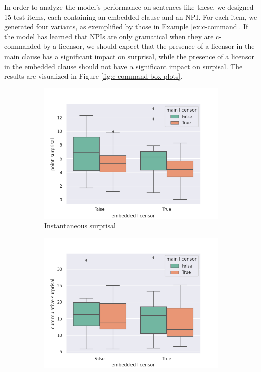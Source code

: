 \documentclass[11pt, round]{article}
\begin{document}
In order to analyze the model's performance on sentences like these, we designed 15 test items, each containing an embedded clause and an NPI. For each item, we generated four variants, as exemplified by those in Example \ref{ex:c-command}. If the model has learned that NPIs are only gramatical when they are c-commanded by a licensor, we should expect that the presence of a licensor in the main clause has a significant impact on surprisal, while the presence of a licensor in the embedded clause should not have a significant impact on surpisal. The results are visualized in Figure \ref{fig:c-command-box-plots}.

\begin{figure}
    \centering
    \begin{subfigure}[b]{0.5\textwidth}
        \centering
        \includegraphics[width=\textwidth]{point_surprisal_c_command}
        \caption{Instantaneous surprisal}
    \end{subfigure}
    \hfill
    \begin{subfigure}[b]{0.5\textwidth}
        \centering
        \includegraphics[width=\textwidth]{cummulative_surprisal_c_command}

\end{subfigure}
\end{figure}
\end{document}

